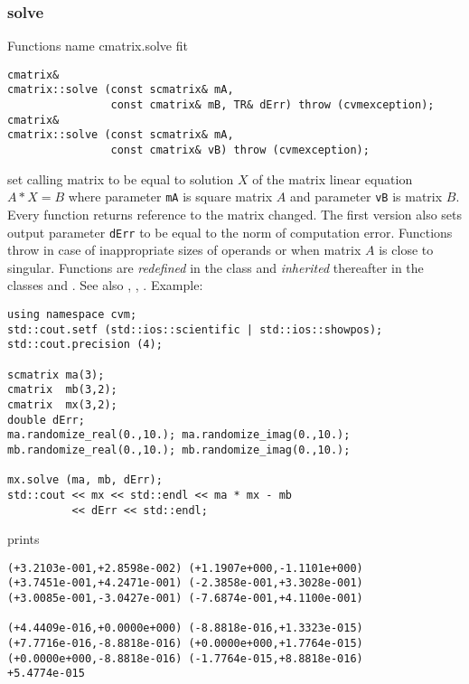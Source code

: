 \subsubsection{solve}
Functions%
\pdfdest name {cmatrix.solve} fit
\begin{verbatim}
cmatrix&
cmatrix::solve (const scmatrix& mA,
                const cmatrix& mB, TR& dErr) throw (cvmexception);
cmatrix&
cmatrix::solve (const scmatrix& mA,
                const cmatrix& vB) throw (cvmexception);
\end{verbatim}
set  calling matrix to be equal to  solution $X$ of the
matrix linear equation
$A*X=B$ where parameter \verb"mA" is square matrix $A$
and parameter \verb"vB" is matrix $B$.
Every function returns  reference to the matrix changed.
The first version also sets output parameter \verb"dErr" to be equal
to the norm of computation error.
Functions throw 
in case of inappropriate sizes
of operands or when matrix $A$ is close to singular.
Functions are \emph{redefined} in the class
 and
\emph{inherited} thereafter in the classes
 and
.
See also
,
,
.
Example:
\begin{Verbatim}
using namespace cvm;
std::cout.setf (std::ios::scientific | std::ios::showpos);
std::cout.precision (4);

scmatrix ma(3);
cmatrix  mb(3,2);
cmatrix  mx(3,2);
double dErr;
ma.randomize_real(0.,10.); ma.randomize_imag(0.,10.);
mb.randomize_real(0.,10.); mb.randomize_imag(0.,10.);

mx.solve (ma, mb, dErr);
std::cout << mx << std::endl << ma * mx - mb
          << dErr << std::endl;
\end{Verbatim}
prints
\begin{Verbatim}
(+3.2103e-001,+2.8598e-002) (+1.1907e+000,-1.1101e+000)
(+3.7451e-001,+4.2471e-001) (-2.3858e-001,+3.3028e-001)
(+3.0085e-001,-3.0427e-001) (-7.6874e-001,+4.1100e-001)

(+4.4409e-016,+0.0000e+000) (-8.8818e-016,+1.3323e-015)
(+7.7716e-016,-8.8818e-016) (+0.0000e+000,+1.7764e-015)
(+0.0000e+000,-8.8818e-016) (-1.7764e-015,+8.8818e-016)
+5.4774e-015
\end{Verbatim}
\newpage




